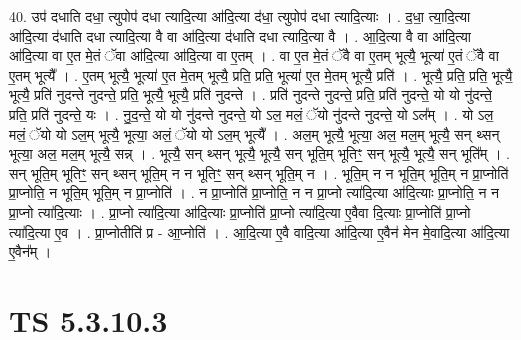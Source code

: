\documentclass[17pt]{extarticle}
\begin{document}
40. उप॑ दधाति दधा॒ त्युपोप॑ दधा त्यादि॒त्या आ॑दि॒त्या द॑धा॒ त्युपोप॑ दधा त्यादि॒त्याः । . द॒धा॒ त्या॒दि॒त्या आ॑दि॒त्या द॑धाति दधा त्यादि॒त्या वै वा आ॑दि॒त्या द॑धाति दधा त्यादि॒त्या वै । . आ॒दि॒त्या वै वा आ॑दि॒त्या आ॑दि॒त्या वा ए॒त मे॒तं ॅवा आ॑दि॒त्या आ॑दि॒त्या वा ए॒तम् । . वा ए॒त मे॒तं ॅवै वा ए॒तम् भूत्यै॒ भूत्या॑ ए॒तं ॅवै वा ए॒तम् भूत्यै᳚ । . ए॒तम् भूत्यै॒ भूत्या॑ ए॒त मे॒तम् भूत्यै॒ प्रति॒ प्रति॒ भूत्या॑ ए॒त मे॒तम् भूत्यै॒ प्रति॑ । . भूत्यै॒ प्रति॒ प्रति॒ भूत्यै॒ भूत्यै॒ प्रति॑ नुदन्ते नुदन्ते॒ प्रति॒ भूत्यै॒ भूत्यै॒ प्रति॑ नुदन्ते । . प्रति॑ नुदन्ते नुदन्ते॒ प्रति॒ प्रति॑ नुदन्ते॒ यो यो नु॑दन्ते॒ प्रति॒ प्रति॑ नुदन्ते॒ यः । . नु॒द॒न्ते॒ यो यो नु॑दन्ते नुदन्ते॒ यो ऽल॒ मलं॒ ॅयो नु॑दन्ते नुदन्ते॒ यो ऽल᳚म् । . यो ऽल॒ मलं॒ ॅयो यो ऽल॒म् भूत्यै॒ भूत्या॒ अलं॒ ॅयो यो ऽल॒म् भूत्यै᳚ । . अल॒म् भूत्यै॒ भूत्या॒ अल॒ मल॒म् भूत्यै॒ सन् थ्सन् भूत्या॒ अल॒ मल॒म् भूत्यै॒ सन्न् । . भूत्यै॒ सन् थ्सन् भूत्यै॒ भूत्यै॒ सन् भूति॒म् भूतिꣳ॒॒ सन् भूत्यै॒ भूत्यै॒ सन् भूति᳚म् । . सन् भूति॒म् भूतिꣳ॒॒ सन् थ्सन् भूति॒म् न न भूतिꣳ॒॒ सन् थ्सन् भूति॒म् न । . भूति॒म् न न भूति॒म् भूति॒म् न प्रा॒प्नोति॑ प्रा॒प्नोति॒ न भूति॒म् भूति॒म् न प्रा॒प्नोति॑ । . न प्रा॒प्नोति॑ प्रा॒प्नोति॒ न न प्रा॒प्नो त्या॑दि॒त्या आ॑दि॒त्याः प्रा॒प्नोति॒ न न प्रा॒प्नो त्या॑दि॒त्याः । . प्रा॒प्नो त्या॑दि॒त्या आ॑दि॒त्याः प्रा॒प्नोति॑ प्रा॒प्नो त्या॑दि॒त्या ए॒वैवा दि॒त्याः प्रा॒प्नोति॑ प्रा॒प्नो त्या॑दि॒त्या ए॒व । . प्रा॒प्नोतीति॑ प्र - आ॒प्नोति॑ । . आ॒दि॒त्या ए॒वै वादि॒त्या आ॑दि॒त्या ए॒वैन॑ मेन मे॒वादि॒त्या आ॑दि॒त्या ए॒वैन᳚म् । \newline
\pagebreak
{}

\section{ TS 5.3.10.3 }
\end{document}
